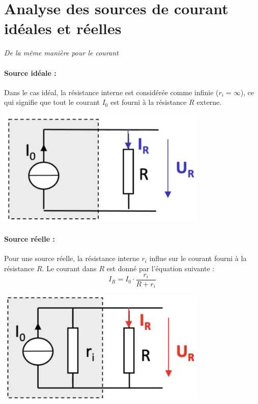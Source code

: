\section{Analyse des sources de courant idéales et réelles}
\textit{De la même manière pour le courant} \\
\vspace{10px}
\begin{minipage}[htp]{0.45\textwidth}
    \paragraph{Source idéale :}
    Dans le cas idéal, la résistance interne est considérée comme infinie ($r_i = \infty$), ce qui signifie que tout le courant $I_0$ est fourni à la résistance $R$ externe.
    \vfill
    \begin{center}
        \includegraphics[width=0.75\textwidth]{chapters/chapter1/images/ideal_i.png}
    \end{center}
\end{minipage}
\hfill
\vline
\hfill
\begin{minipage}[htp]{0.45\textwidth}
    \paragraph{Source réelle :}
    Pour une source réelle, la résistance interne $r_i$ influe sur le courant fourni à la résistance $R$. Le courant dans $R$ est donné par l'équation suivante :
    \[
    I_R = I_0 \cdot \frac{r_i}{R + r_i}
    \]
    \vfill
    \begin{center}
        \includegraphics[width=0.75\textwidth]{chapters/chapter1/images/reel_i.png}
    \end{center}
\end{minipage}
